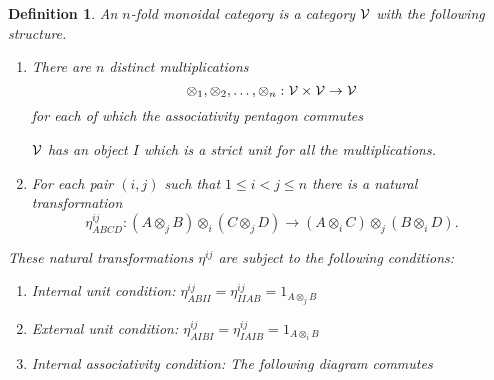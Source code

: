 \documentclass{tac}
\newtheorem{definition}{Definition}
\begin{document}
{\begin{definition}\label{iterated} An $n${\it -fold monoidal category} is a category ${\cal V}$
          with the following structure. 
          \begin{enumerate}
          \item There are $n$ distinct multiplications
          $$\otimes_1,\otimes_2,\dots, \otimes_n:{\cal V}\times{\cal V}\to{\cal V}$$
          for each of which the associativity pentagon commutes
          
          \noindent
  		          \begin{center}
  		                    \end{center}
  	                    
          
          ${\cal V}$ has an object $I$ which is a strict unit
          for all the multiplications.
          \item For each pair $(i,j)$ such that $1\le i<j\le n$ there is a natural
          transformation
          $$\eta^{ij}_{ABCD}: (A\otimes_j B)\otimes_i(C\otimes_j D)\to
          (A\otimes_i C)\otimes_j(B\otimes_i D).$$
          \end{enumerate}
          These natural transformations $\eta^{ij}$ are subject to the following conditions:
          \begin{enumerate}
          \item[(a)] Internal unit condition: 
          $\eta^{ij}_{ABII}=\eta^{ij}_{IIAB}=1_{A\otimes_j B}$
          \item[(b)] External unit condition:
          $\eta^{ij}_{AIBI}=\eta^{ij}_{IAIB}=1_{A\otimes_i B}$
          \item[(c)] Internal associativity condition: The following diagram commutes
          

\end{enumerate}
\end{definition}}
\end{document}

